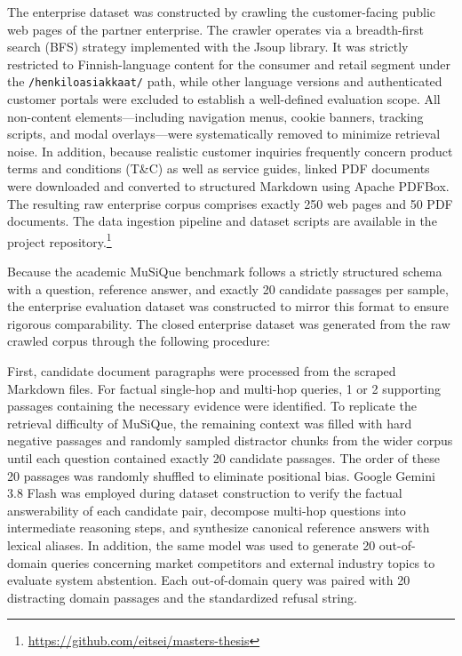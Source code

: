The enterprise dataset was constructed by crawling the customer-facing public web pages of the partner enterprise. The crawler operates via a breadth-first search (BFS) strategy implemented with the Jsoup library. It was strictly restricted to Finnish-language content for the consumer and retail segment under the \texttt{/henkiloasiakkaat/} path, while other language versions and authenticated customer portals were excluded to establish a well-defined evaluation scope. All non-content elements---including navigation menus, cookie banners, tracking scripts, and modal overlays---were systematically removed to minimize retrieval noise. In addition, because realistic customer inquiries frequently concern product terms and conditions (T\&C) as well as service guides, linked PDF documents were downloaded and converted to structured Markdown using Apache PDFBox. The resulting raw enterprise corpus comprises exactly 250 web pages and 50 PDF documents. The data ingestion pipeline and dataset scripts are available in the project repository.\footnote{\url{https://github.com/eitsei/masters-thesis}}

Because the academic MuSiQue benchmark follows a strictly structured schema with a question, reference answer, and exactly 20 candidate passages per sample, the enterprise evaluation dataset was constructed to mirror this format to ensure rigorous comparability. The closed enterprise dataset was generated from the raw crawled corpus through the following procedure:

First, candidate document paragraphs were processed from the scraped Markdown files. For factual single-hop and multi-hop queries, 1 or 2 supporting passages containing the necessary evidence were identified. To replicate the retrieval difficulty of MuSiQue, the remaining context was filled with hard negative passages and randomly sampled distractor chunks from the wider corpus until each question contained exactly 20 candidate passages. The order of these 20 passages was randomly shuffled to eliminate positional bias. Google Gemini 3.8 Flash was employed during dataset construction to verify the factual answerability of each candidate pair, decompose multi-hop questions into intermediate reasoning steps, and synthesize canonical reference answers with lexical aliases. In addition, the same model was used to generate 20 out-of-domain queries concerning market competitors and external industry topics to evaluate system abstention. Each out-of-domain query was paired with 20 distracting domain passages and the standardized refusal string.

